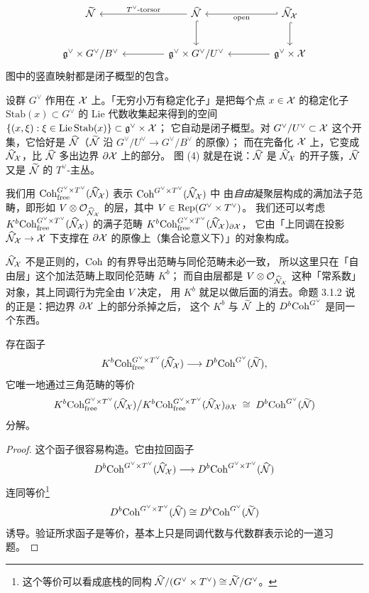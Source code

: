 \begin{equation}
\begin{tikzcd}[column sep=4.2em, row sep=2.4em]
\tN & \hN \arrow[l,"T^\vee\text{-torsor}"'] \arrow[d,hook]
   & \hNX \arrow[l,hook',"\text{open}"] \arrow[d,hook] \\
\frg^\vee\times G^\vee/B^\vee
   & \frg^\vee\times G^\vee/U^\vee \arrow[l]
   & \frg^\vee\times\cX \arrow[l]
\end{tikzcd}
\end{equation}
图中的竖直映射都是闭子概型的包含。

\begin{yizhu}
设群 $G^\vee$ 作用在 $\mathcal{X}$ 上。「无穷小万有稳定化子」是把每个点 $x\in\mathcal{X}$ 的稳定化子
$\mathrm{Stab}(x)\subset G^\vee$ 的 Lie 代数收集起来得到的空间
$\{(x,\xi):\xi\in\mathrm{Lie}\,\mathrm{Stab}(x)\}\subset\mathfrak{g}^\vee\times\mathcal{X}$；
它自动是闭子概型。对 $G^\vee/U^\vee\subset\mathcal{X}$ 这个开集，它恰好是 $\widehat{\mathcal{N}}$（$\widetilde{\mathcal{N}}$ 沿 $G^\vee/U^\vee\to G^\vee/B^\vee$ 的原像）；
而在完备化 $\mathcal{X}$ 上，它变成 $\widehat{\mathcal{N}}_{\mathcal{X}}$，比 $\widehat{\mathcal{N}}$ 多出边界 $\partial\mathcal{X}$ 上的部分。
图 (4) 就是在说：$\widehat{\mathcal{N}}$ 是 $\widehat{\mathcal{N}}_{\mathcal{X}}$ 的开子簇，$\widehat{\mathcal{N}}$ 又是 $\widetilde{\mathcal{N}}$ 的 $T^\vee$-主丛。
\end{yizhu}

我们用 $\mathrm{Coh}^{G^\vee\times T^\vee}_{\mathrm{free}}(\widehat{\mathcal{N}}_{\mathcal{X}})$ 表示 $\mathrm{Coh}^{G^\vee\times T^\vee}(\widehat{\mathcal{N}}_{\mathcal{X}})$ 中
由\emph{自由}凝聚层构成的满加法子范畴，即形如 $V\otimes\mathcal{O}_{\widehat{\mathcal{N}}_{\mathcal{X}}}$ 的层，其中 $V\in\mathrm{Rep}(G^\vee\times T^\vee)$。
我们还可以考虑 $K^b\mathrm{Coh}^{G^\vee\times T^\vee}_{\mathrm{free}}(\widehat{\mathcal{N}}_{\mathcal{X}})$ 的满子范畴
$K^b\mathrm{Coh}^{G^\vee\times T^\vee}_{\mathrm{free}}(\widehat{\mathcal{N}}_{\mathcal{X}})_{\partial\mathcal{X}}$，
它由「上同调在投影 $\widehat{\mathcal{N}}_{\mathcal{X}}\to\mathcal{X}$ 下支撑在 $\partial\mathcal{X}$ 的原像上（集合论意义下）」的对象构成。

\begin{yizhu}
$\widehat{\mathcal{N}}_{\mathcal{X}}$ 不是正则的，$\mathrm{Coh}$ 的有界导出范畴与同伦范畴未必一致，
所以这里只在「自由层」这个加法范畴上取同伦范畴 $K^b$；
而自由层都是 $V\otimes\mathcal{O}_{\widehat{\mathcal{N}}_{\mathcal{X}}}$ 这种「常系数」对象，其上同调行为完全由 $V$ 决定，
用 $K^b$ 就足以做后面的消去。命题 3.1.2 说的正是：把边界 $\partial\mathcal{X}$ 上的部分杀掉之后，
这个 $K^b$ 与 $\widetilde{\mathcal{N}}$ 上的 $D^b\mathrm{Coh}^{G^\vee}$ 是同一个东西。
\end{yizhu}

\begin{proposition}\label{prop:Kquot}
存在函子
\[
K^b\mathrm{Coh}^{G^\vee\times T^\vee}_{\mathrm{free}}(\widehat{\mathcal{N}}_{\mathcal{X}})\longrightarrow D^b\mathrm{Coh}^{G^\vee}(\widetilde{\mathcal{N}}),
\]
它唯一地通过三角范畴的等价
\[
K^b\mathrm{Coh}^{G^\vee\times T^\vee}_{\mathrm{free}}(\widehat{\mathcal{N}}_{\mathcal{X}})\big/
K^b\mathrm{Coh}^{G^\vee\times T^\vee}_{\mathrm{free}}(\widehat{\mathcal{N}}_{\mathcal{X}})_{\partial\mathcal{X}}
\;\cong\; D^b\mathrm{Coh}^{G^\vee}(\widetilde{\mathcal{N}})
\]
分解。

\begin{proof}
这个函子很容易构造。它由拉回函子
\[
D^b\mathrm{Coh}^{G^\vee\times T^\vee}(\widehat{\mathcal{N}}_{\mathcal{X}})\longrightarrow D^b\mathrm{Coh}^{G^\vee\times T^\vee}(\widehat{\mathcal{N}})
\]
连同等价\footnote{这个等价可以看成底栈的同构 $\widehat{\mathcal{N}}/(G^\vee\times T^\vee)\cong\widetilde{\mathcal{N}}/G^\vee$。}
\[
D^b\mathrm{Coh}^{G^\vee\times T^\vee}(\widehat{\mathcal{N}})\cong D^b\mathrm{Coh}^{G^\vee}(\widetilde{\mathcal{N}})
\]
诱导。验证所求函子是等价，基本上只是同调代数与代数群表示论的一道习题。
\end{proof}
\end{proposition}

